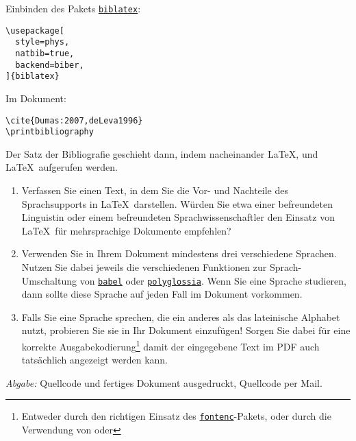 \documentclass{scrartcl}
\newcommand{\abgabe}[1]{\par\noindent\textit{Abgabe:} #1}
\newcommand{\pkg}[1]{\href{http://ctan.org/pkg/#1}{\texttt{#1}}}
\begin{document}
\newsavebox{\SolutionCodeB}
\begin{lrbox}{\SolutionCodeB}
\begin{minipage}{\textwidth}
Einbinden des Pakets \pkg{biblatex}:
\begin{lstlisting}
\usepackage[
  style=phys,
  natbib=true,
  backend=biber,
]{biblatex}
\end{lstlisting}
Im Dokument:
\begin{lstlisting}
\cite{Dumas:2007,deLeva1996}
\printbibliography
\end{lstlisting}
\end{minipage}
\end{lrbox}

\begin{solution}
\noindent\usebox\SolutionCodeA

\noindent\usebox\SolutionCodeB

Der Satz der Bibliografie geschieht dann, indem nacheinander \LaTeX,  und \LaTeX\ aufgerufen werden.
\end{solution}


\begin{question}[subtitle=Mehrsprachiger Satz]{6}
\begin{enumerate}[label=\alph*)]
	\item Verfassen Sie einen Text, in dem Sie die Vor- und Nachteile des Sprachsupports in \LaTeX\ darstellen. Würden Sie etwa einer befreundeten Linguistin oder einem befreundeten Sprachwissenschaftler den Einsatz von \LaTeX\ für mehrsprachige Dokumente empfehlen?
	\item Verwenden Sie in Ihrem Dokument mindestens drei verschiedene Sprachen. Nutzen Sie dabei jeweils die verschiedenen Funktionen zur Sprach-Umschaltung von \pkg{babel} oder \pkg{polyglossia}. Wenn Sie eine Sprache studieren, dann sollte diese Sprache auf jeden Fall im Dokument vorkommen. 
	\item Falls Sie eine Sprache sprechen, die ein anderes als das lateinische Alphabet nutzt, probieren Sie sie in Ihr Dokument einzufügen! Sorgen Sie dabei für eine korrekte Ausgabekodierung\footnote{Entweder durch den richtigen Einsatz des \pkg{fontenc}-Pakets, oder durch die Verwendung von  oder } damit der eingegebene Text im PDF auch tatsächlich angezeigt werden kann.
\end{enumerate}
	\abgabe{Quellcode und fertiges Dokument ausgedruckt, Quellcode per Mail.}
\end{question}
 
\end{document}
